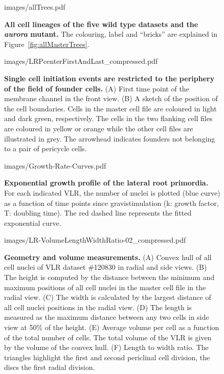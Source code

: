 \documentclass[11pt,a4paper, final]{article}
\begin{document}
\clearpage
%
%
\begin{sidewaysfigure}
\centering
		\begin{overpic}[width=1.\linewidth]{images/allTrees.pdf}
		\end{overpic}
\caption[All cell lineages of the five wild type datasets and the \emph{aurora} mutant.]
{
{\bf All cell lineages of the five wild type datasets and the \emph{aurora} mutant.} The colouring, label and ``bricks'' are explained in Figure~\ref{fig:allMasterTrees}.
}
	\label{fig:allTrees}
\end{sidewaysfigure}
\clearpage
%
\begin{figure}[htbp]
\centering
	\begin{overpic}[width=0.5\linewidth]{images/LRPcenterFirstAndLast_compressed.pdf}
	\end{overpic}
\caption[Single cell initiation events are restricted to the periphery of the field of founder cells.]
{{\bf Single cell initiation events are restricted to the periphery of the field of founder cells.} (A) First time point of the membrane channel in the front view. (B) A sketch of the position of the cell boundaries. Cells in the master cell file are coloured in light and dark green, respectively. The cells in the two flanking cell files are coloured in yellow or orange while the other cell files are illustrated in grey. The arrowhead indicates founders not belonging to a pair of pericycle cells.}
	\label{fig:founderstop}
\end{figure}
%
\clearpage
%
%
\begin{figure}[htbp]
\centering
	\begin{overpic}[width=1.\linewidth]{images/Growth-Rate-Curves.pdf}
	\end{overpic}
\caption[Exponential growth profile of the lateral root primordia.]
{{\bf Exponential growth profile of the lateral root primordia.} For each indicated VLR, the number of nuclei is plotted (blue curve) as a function of time points since gravistimulation (k: growth factor, T: doubling time). The red dashed line represents the fitted exponential curve.}
	\label{fig:growthcurves}
\end{figure}
%
\clearpage
%
\begin{figure}[htbp]
\centering
	\begin{overpic}[width=1.\linewidth]{images/LR-VolumeLengthWidthRatio-02_compressed.pdf}
	\end{overpic}
\caption[Geometry and volume measurements.]
{{\bf Geometry and volume measurements.} (A) Convex hull of all cell nuclei of VLR dataset \#120830 in radial and side views. (B) The height is computed by the distance between the minimum and maximum positions of all cell nuclei in the master cell file in the radial view. (C) The width is calculated by the largest distance of all cell nuclei positions in the radial view. (D) The length is measured as the maximum distance between any two cells in side view at 50\% of the height. (E) Average volume per cell as a function of the total number of cells. The total volume of the VLR is given by the volume of the convex hull. (F) Length to width ratio. The triangles highlight the first and second periclinal cell division, the discs the first radial division.}
	\label{fig:VLWR}
\end{figure}
\end{document}
